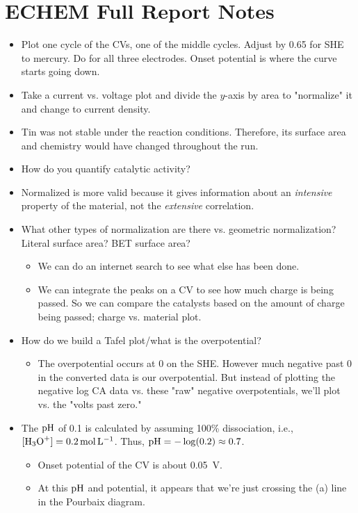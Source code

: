 \documentclass[../notes.tex]{subfiles}
\begin{document}
\section{ECHEM Full Report Notes}
\begin{itemize}
    \item {}Plot one cycle of the CVs, one of the middle cycles. Adjust by 0.65 for SHE to mercury. Do for all three electrodes. Onset potential is where the curve starts going down.
    \item Take a current vs. voltage plot and divide the $y$-axis by area to "normalize" it and change to current density.
    \item Tin was not stable under the reaction conditions. Therefore, its surface area and chemistry would have changed throughout the run.
    \item How do you quantify catalytic activity?
    \item Normalized is more valid because it gives information about an \emph{intensive} property of the material, not the \emph{extensive} correlation.
    \item What other types of normalization are there vs. geometric normalization? Literal surface area? BET surface area?
    \begin{itemize}
        \item We can do an internet search to see what else has been done.
        \item We can integrate the peaks on a CV to see how much charge is being passed. So we can compare the catalysts based on the amount of charge being passed; charge vs. material plot.
    \end{itemize}
    \item How do we build a Tafel plot/what is the overpotential?
    \begin{itemize}
        \item The overpotential occurs at 0 on the SHE. However much negative past 0 in the converted data is our overpotential. But instead of plotting the negative log CA data vs. these "raw" negative overpotentials, we'll plot vs. the "volts past zero."
    \end{itemize}
    \item The $\operatorname{pH}$ of \SI{0.1}{\molar}  is calculated by assuming 100\% dissociation, i.e., $[\ce{H3O+}]=\SI{0.2}{\mole\per\liter}$. Thus, $\operatorname{pH}=-\log(0.2)\approx 0.7$.
    \begin{itemize}
        \item Onset potential of the  CV is about \SI{0.05}{\volt}.
        \item At this $\operatorname{pH}$ and potential, it appears that we're just crossing the (a) line in the Pourbaix diagram.
    \end{itemize}
\end{itemize}
\end{document}
